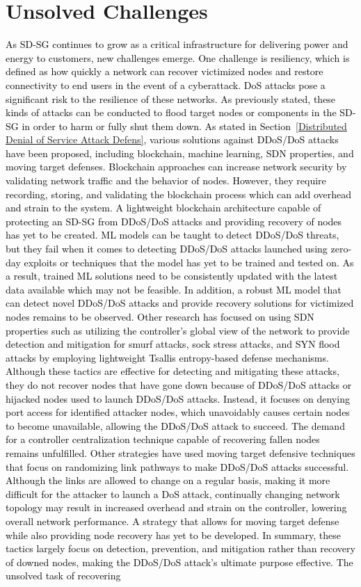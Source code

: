 \documentclass[conference]{IEEEtran}
\begin{document}
\section{Unsolved Challenges}
\label{Unsolved Challenges}
\textcolor{black}{
As SD-SG continues to grow as a critical infrastructure for delivering power and energy to customers, new challenges emerge. One challenge is resiliency, which is defined as how quickly a network can recover victimized nodes and restore connectivity to end users in the event of a cyberattack. DoS attacks pose a significant risk to the resilience of these networks. As previously stated, these kinds of attacks can be conducted to flood target nodes or components in the SD-SG in order to harm or fully shut them down. As stated in Section~\ref{Distributed Denial of Service Attack Defens}, various solutions against DDoS/DoS attacks have been proposed, including blockchain, machine learning, SDN properties, and moving target defenses. Blockchain approaches can increase network security by validating network traffic and the behavior of nodes. However, they require recording, storing, and validating the blockchain process which can add overhead and strain to the system. A lightweight blockchain architecture capable of protecting an SD-SG from DDoS/DoS attacks and providing recovery of nodes has yet to be created. ML models can be taught to detect DDoS/DoS threats, but they fail when it comes to detecting DDoS/DoS attacks launched using zero-day exploits or techniques that the model has yet to be trained and tested on. As a result, trained ML solutions need to be consistently updated with the latest data available which may not be feasible. In addition, a robust ML model that can detect novel DDoS/DoS attacks and provide recovery solutions  for victimized nodes remains to be observed. Other research has focused on using SDN properties such as utilizing the controller's global view of the network to provide detection and mitigation for smurf attacks, sock stress attacks, and SYN flood attacks by employing lightweight Tsallis entropy-based defense mechanisms. Although these tactics are effective for detecting and mitigating these attacks, they do not recover nodes that have gone down because of DDoS/DoS attacks or hijacked nodes used to launch DDoS/DoS attacks. Instead, it focuses on denying port access for identified attacker nodes, which unavoidably causes certain nodes to become unavailable, allowing the DDoS/DoS attack to succeed. The demand for a controller centralization technique capable of recovering fallen nodes remains unfulfilled. Other strategies have used moving target defensive techniques that focus on randomizing link pathways to make DDoS/DoS attacks successful. Although the links are allowed to change on a regular basis, making it more difficult for the attacker to launch a DoS attack, continually changing network topology may result in increased overhead and strain on the controller, lowering overall network performance. A strategy that allows for moving target defense while also providing node recovery has yet to be developed. In summary, these tactics largely focus on detection, prevention, and mitigation rather than recovery of downed nodes, making the DDoS/DoS attack's ultimate purpose effective. The unsolved task of recovering }
\end{document}
